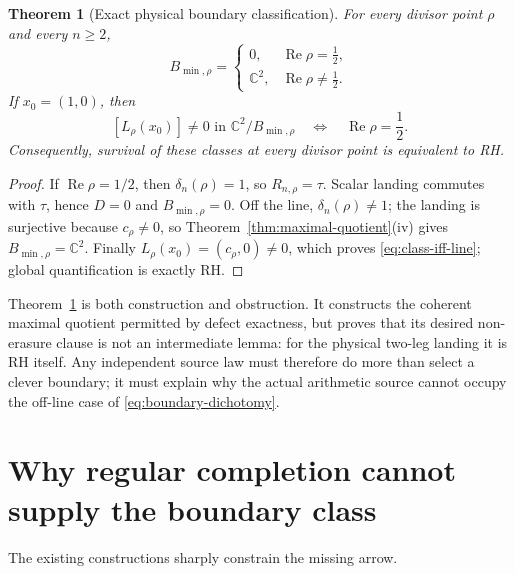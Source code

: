\documentclass[11pt]{article}
\newtheorem{theorem}{Theorem}[section]
\theoremstyle{definition}
\theoremstyle{remark}
\newcommand{\C}{\mathbb C}
\newcommand{\Rea}{\operatorname{Re}}
\begin{document}
\begin{theorem}[Exact physical boundary classification]
\label{thm:physical-boundary-classification}
For every divisor point \(\rho\) and every \(n\geq2\),
\[
 B_{\min,\rho}=
 \begin{cases}
   0,&\Rea\rho=\tfrac12,\\
   \C^2,&\Rea\rho\neq\tfrac12.
 \end{cases}
\tag{6.9}\label{eq:boundary-dichotomy}
\]
If \(x_0=(1,0)\), then
\[
 [L_\rho(x_0)]\neq0\text{ in }\C^2/B_{\min,\rho}
 \quad\Longleftrightarrow\quad
 \Rea\rho=\frac12.
\tag{6.10}\label{eq:class-iff-line}
\]
Consequently, survival of these classes at every divisor point is equivalent
to RH.
\end{theorem}

\begin{proof}
If \(\Rea\rho=1/2\), then \(\delta_n(\rho)=1\), so
\(R_{n,\rho}=\tau\).  Scalar landing commutes with \(\tau\), hence \(D=0\)
and \(B_{\min,\rho}=0\).  Off the line, \(\delta_n(\rho)\neq1\); the landing
is surjective because \(c_\rho\neq0\), so
Theorem~\ref{thm:maximal-quotient}(iv) gives
\(B_{\min,\rho}=\C^2\).  Finally \(L_\rho(x_0)=(c_\rho,0)\neq0\), which
proves \eqref{eq:class-iff-line}; global quantification is exactly RH.
\end{proof}

Theorem~\ref{thm:physical-boundary-classification} is both construction and
obstruction.  It constructs the coherent maximal quotient permitted by
defect exactness, but proves that its desired non-erasure clause is not an
intermediate lemma: for the physical two-leg landing it is RH itself.  Any
independent source law must therefore do more than select a clever boundary;
it must explain why the actual arithmetic source cannot occupy the off-line
case of \eqref{eq:boundary-dichotomy}.

\section{Why regular completion cannot supply the boundary class}

The existing constructions sharply constrain the missing arrow.
\end{document}

